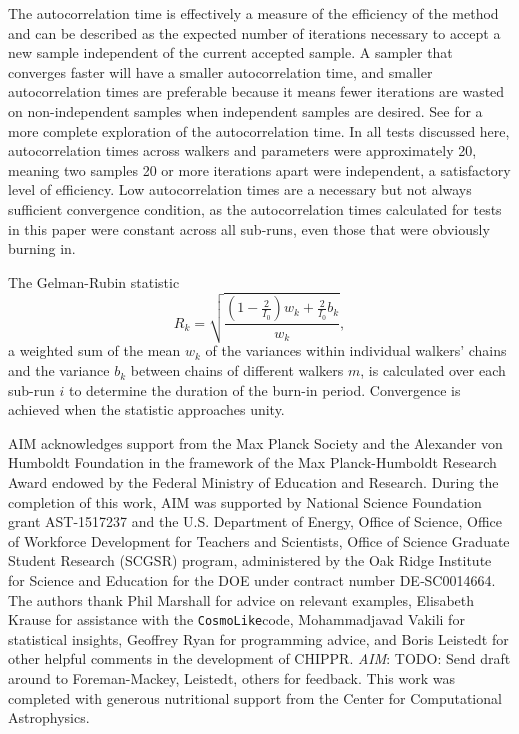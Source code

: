 \documentclass[iop]{emulateapj}
\newcommand{\todo}[3]{{\color{#2}\emph{#1}: #3}}
\newcommand{\aim}[1]{\todo{AIM}{red}{#1}}
\newcommand{\project}[1]{\textsc{#1}}
\newcommand{\Chippr}{\project{CHIPPR}}%
\newcommand{\repo}[1]{\texttt{#1}}
\newcommand{\cosmolike}{\repo{CosmoLike}}
\begin{document}
The autocorrelation time is effectively a measure of the efficiency of the method and can be described as the expected number of iterations necessary to accept a new sample independent of the current accepted sample.  
A sampler that converges faster will have a smaller autocorrelation time, and smaller autocorrelation times are preferable because it means fewer iterations are wasted on non-independent samples when independent samples are desired.  
See \citet{foreman-mackey_emcee_2013} for a more complete exploration of the autocorrelation time.  
In all tests discussed here, autocorrelation times across walkers and parameters were approximately 20, meaning two samples 20 or more iterations apart were independent, a satisfactory level of efficiency.  
Low autocorrelation times are a necessary but not always sufficient convergence condition, as the autocorrelation times calculated for tests in this paper were constant across all sub-runs, even those that were obviously burning in.  

The Gelman-Rubin statistic
\begin{equation}
\label{eqn:gr}
R_{k} = \sqrt{\frac{(1 - \frac{2}{I_{0}}) w_{k} + \frac{2}{I_{0}} b_{k}}{w_{k}}},
\end{equation}
a weighted sum of the mean $w_{k}$ of the variances within individual walkers' chains and the variance $b_{k}$ between chains of different walkers $m$, is calculated over each sub-run $i$ to determine the duration of the burn-in period.  
Convergence is achieved when the statistic approaches unity.  

\begin{acknowledgements}
AIM acknowledges support from the Max Planck Society and the Alexander von Humboldt Foundation in the framework of the Max Planck-Humboldt Research Award endowed by the Federal Ministry of Education and Research.
During the completion of this work, AIM was supported by National Science Foundation grant AST-1517237 and the U.S. Department of Energy, Office of Science, Office of Workforce Development for Teachers and Scientists, Office of Science Graduate Student Research (SCGSR) program, administered by the Oak Ridge Institute for Science and Education for the DOE under contract number DE‐SC0014664.
The authors thank Phil Marshall for advice on relevant examples, Elisabeth Krause for assistance with the \cosmolike code, Mohammadjavad Vakili for statistical insights, Geoffrey Ryan for programming advice, and Boris Leistedt for other helpful comments in the development of \Chippr.
\aim{TODO: Send draft around to Foreman-Mackey, Leistedt, others for feedback.}
This work was completed with generous nutritional support from the Center for Computational Astrophysics.
\end{acknowledgements}



\end{document}
